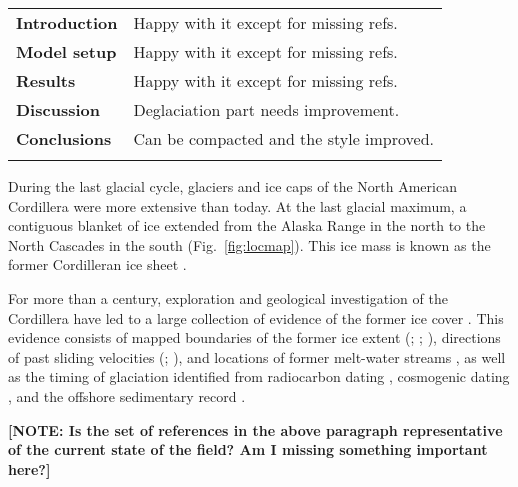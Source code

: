\documentclass[tc, manuscript]{copernicus}
\newcommand{\note}[1]{\textbf{[NOTE: #1]}}
\begin{document}
\begin{center}
\begin{tabular}{>{\bfseries}ll}
    \tophline
    Introduction & Happy with it except for missing refs.\\
    Model setup  & Happy with it except for missing refs.\\
    Results      & Happy with it except for missing refs.\\
    Discussion   & Deglaciation part needs improvement.\\
    Conclusions  & Can be compacted and the style improved.\\
    \bottomhline
\end{tabular}
\end{center}

\introduction
\label{sec:intro}

During the last glacial cycle, glaciers and ice caps of the North American
Cordillera were more extensive than today. At the last glacial maximum, a
contiguous blanket of ice extended from the Alaska Range in the north to the
North Cascades in the south (Fig.~\ref{fig:locmap}). This ice mass is known as
the former Cordilleran ice sheet \citep{Dawson.1888}.

For more than a century, exploration and geological investigation of the
Cordillera have led to a large collection of evidence of the former ice cover
\citep{Jackson.Clague.1991}. This evidence consists of mapped boundaries of the
former ice extent (\citealp[Fig.~1.12]{Clague.1989}; \citealp{Duk-Rodkin.1999};
\citealp{Dyke.2004}), directions of past sliding velocities
(\citealp{Prest.etal.1968}; \citealp[Fig.~2]{Kleman.etal.2010}), and locations
of former
melt-water streams \citep{Margold.etal.2011, Margold.etal.2013}, as well as the
timing of glaciation identified from radiocarbon dating \citep[e.g.,][]
{Clague.1981, Porter.Swanson.1998}, cosmogenic dating \citep[e.g.,][]
{Ward.etal.2007, Menounos.etal.2009, Stroeven.etal.2010, Stroeven.etal.2013},
and the offshore sedimentary record \citep{Cosma.etal.2008, Davies.etal.2011}.

\note{Is the set of references in the above paragraph representative of the
      current state of the field? Am I missing something important here?}
\end{document}
